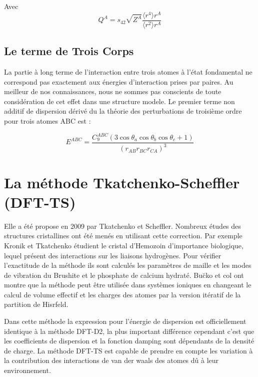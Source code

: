 	Avec
	\begin{equation}
	Q^{A} = s_{42}\sqrt{Z^{A}} \frac{\langle r^{4}\rangle r^{A}}{\langle r^{2}\rangle r^{A}}
	\end{equation}
	
	\bigskip
	\subsection{Le terme de Trois Corps}
	\bigskip
	
	La partie à long terme de l'interaction entre trois atomes à l'état fondamental ne correspond pas exactement aux énergies d'interaction prises par paires. Au meilleur de nos connaissances, nous ne sommes pas conscients de toute considération de cet effet dans une structure modele. Le premier terme non additif de dispersion dérivé du
	la théorie des perturbations de troisième ordre pour trois atomes ABC est :
	
	\begin{equation}
	E^{ABC} = \frac{C_{9}^{ABC}(3\cos\theta_{a}\cos\theta_{b}\cos\theta_{c}+ 1)}{(r_{AB} r_{BC} r_{CA})^{3}}
	\end{equation}
	
	\bigskip
	\section{La méthode Tkatchenko-Scheffler (DFT-TS)}
	
	Elle a été propose en 2009 par Tkatchenko et Scheffler\cite{tkatchenko2009accurate}. Nombreux études des structures cristallines ont été menés en utilisant cette correction. Par exemple Kronik et Tkatchenko\cite{kronik2014understanding} étudient le cristal d'Hemozoin d'importance biologique, lequel présent des interactions sur les liaisons hydrogènes. Pour vérifier l'exactitude de la méthode ils sont calculés les paramètres de maille et les modes de vibration du Brushite et le phosphate de calcium hydraté. Bu\u{c}ko et col\cite{buvcko2014extending} ont montre que la méthode peut être utilisée dans systèmes ioniques en changeant le calcul de volume effectif et les charges des atomes par la version itératif de la partition de Hisrfeld.
	
	Dans cette méthode la expression pour l'énergie de dispersion est officiellement identique à la méthode DFT-D2, la plus important différence cependant c'est que les coefficients de dispersion et la fonction damping sont dépendants de la densité de charge. La méthode DFT-TS est capable de prendre en compte les variation à la contribution des interactions de van der waals des atomes dû à leur environnement. 
	

